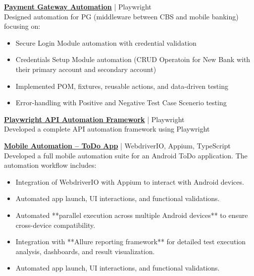 \documentclass[a4paper,10pt]{article}
\begin{document}
\noindent\textbf{\href{https://github.com/bhimpd/Payment-Gateway}{Payment Gateway Automation}} | Playwright \\
Designed automation for PG (middleware between CBS and mobile banking) focusing on:
\begin{itemize}
    \item Secure Login Module automation with credential validation
    \item Credentials Setup Module automation (CRUD Operatoin for  New Bank with their primary account and secondary account)
    \item Implemented POM, fixtures, reusable actions, and data-driven testing
    \item Error-handling with Positive and Negative Test Case Scenerio testing
\end{itemize}

\noindent\textbf{\href{https://github.com/bhimpd/playwright_api_automation}{Playwright API Automation Framework}} | Playwright \\
Developed a complete API automation framework using Playwright

\noindent\textbf{\href{https://github.com/bhimpd/mble_automation_to_do_app}{Mobile Automation – ToDo App}} | WebdriverIO, Appium, TypeScript \\
Developed a full mobile automation suite for an Android ToDo application. The automation workflow includes:
\begin{itemize}
    \item Integration of WebdriverIO with Appium to interact with Android devices.
    \item Automated app launch, UI interactions, and functional validations.
  \item Automated **parallel execution across multiple Android devices** to ensure cross-device compatibility.
    \item Integration with **Allure reporting framework** for detailed test execution analysis, dashboards, and result visualization.
    \item Automated app launch, UI interactions, and functional validations.\end{itemize}
\end{document}
